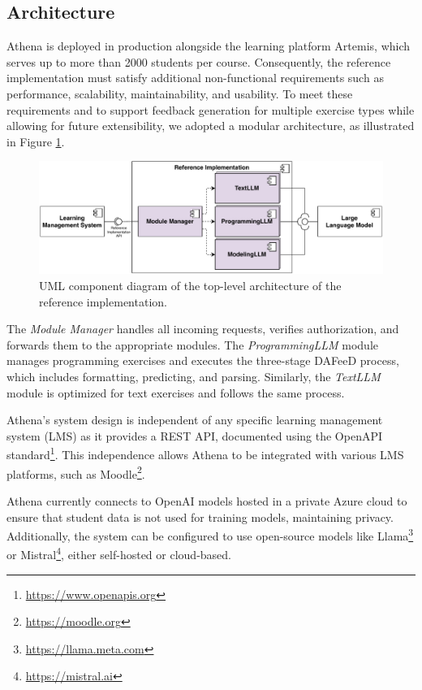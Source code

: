 \documentclass[manuscript,screen,review]{acmart}
\begin{document}
\subsection{Architecture}

Athena is deployed in production alongside the learning platform Artemis, which serves up to more than 2000 students per course.
Consequently, the reference implementation must satisfy additional non-functional requirements such as performance, scalability, maintainability, and usability.
To meet these requirements and to support feedback generation for multiple exercise types while allowing for future extensibility, we adopted a modular architecture, as illustrated in Figure \ref{fig:Athena-architecture}.

\begin{figure}[htbp]
  \centering
  \includegraphics[width=0.8\linewidth]{figures/Athena-Architecture.pdf}
  \caption{UML component diagram of the top-level architecture of the reference implementation.}
  \label{fig:Athena-architecture}
\end{figure}

The \textit{Module Manager} handles all incoming requests, verifies authorization, and forwards them to the appropriate modules.
The \textit{ProgrammingLLM} module manages programming exercises and executes the three-stage DAFeeD process, which includes formatting, predicting, and parsing. 
Similarly, the \textit{TextLLM} module is optimized for text exercises and follows the same process.

Athena's system design is independent of any specific learning management system (LMS) as it provides a REST API, documented using the OpenAPI standard\footnote{\url{https://www.openapis.org}}.
This independence allows Athena to be integrated with various LMS platforms, such as Moodle\footnote{\url{https://moodle.org}}.

Athena currently connects to OpenAI models hosted in a private Azure cloud to ensure that student data is not used for training models, maintaining privacy.
Additionally, the system can be configured to use open-source models like Llama\footnote{\url{https://llama.meta.com}} or Mistral\footnote{\url{https://mistral.ai}}, either self-hosted or cloud-based.
\end{document}
